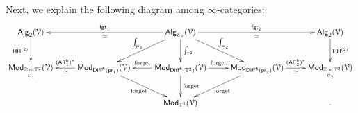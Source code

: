 \documentclass{amsart}
\theoremstyle{definition}
\theoremstyle{remark}
\DeclareMathOperator{\pr}{\mathsf{pr}}
\DeclareMathOperator{\Alg}{\sf Alg}
\DeclareMathOperator{\Mod}{\sf Mod}
\DeclareMathOperator{\Diff}{{\sf Diff}}
\DeclareMathOperator{\fr}{\sf fr}
\def\cE{\mathcal E}\def\cF{\mathcal F}\def\cG{\mathcal G}\def\cH{\mathcal H}
\DeclareMathOperator{\HHt}{{\sf HH}^{(2)}}
\DeclareMathOperator{\Aff}{\sf Aff}
\begin{document}
Next, we explain the following diagram among $\infty$-categories: 
\begin{equation}
\label{e73}
\xymatrix{
\Alg_2(\cV)
\ar[d]_-{\HHt}
&
&
\Alg_{\cE_2}(\cV)
\ar[ll]^-{\simeq}_-{{\sf fgt}_1}
\ar[rr]^-{{\sf fgt}_2}_-{\simeq}
\ar[d]^-{\int_{\TT^2}}
\ar[dr]^-{\int_{\pr_2}}
\ar[dl]_-{\int_{\pr_1}}
&
&
\Alg_2(\cV)
\ar[d]^-{\HHt}
\\
\Mod_{\ZZ \underset{U_1} \ltimes \TT^2}(\cV)
&
\Mod_{\Diff^{\fr}(\pr_1)}(\cV)
\ar[l]^-{\simeq}_-{(\Aff_1^{\fr})^\ast}
\ar[dr]_-{\rm forget}
&
\Mod_{\Diff^{\fr}(\TT^2)}(\cV)
\ar[d]^-{\rm forget}
\ar[r]^-{\rm forget}
\ar[l]_-{\rm forget}
&
\Mod_{\Diff^{\fr}(\pr_2)}(\cV)
\ar[r]_-{\simeq}^-{(\Aff_2^{\fr})^\ast}
\ar[dl]^-{\rm forget}
&
\Mod_{\ZZ \underset{U_2} \ltimes \TT^2}(\cV)
\\
&
&
\Mod_{\TT^2}(\cV)
&
&
.
}
\end{equation}
\end{document}
